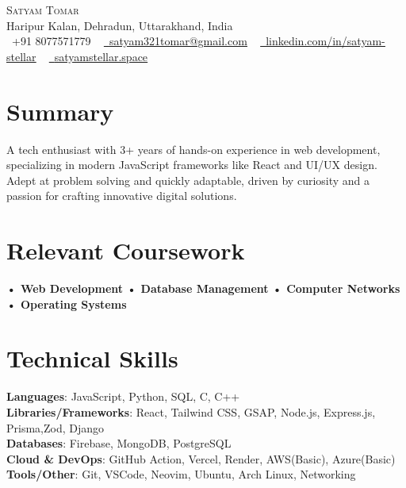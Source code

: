 \documentclass[letterpaper,11pt]{article}
\begin{document}
\begin{center}
    {\Huge \scshape Satyam Tomar} \\ \vspace{1pt}
    Haripur Kalan, Dehradun, Uttarakhand, India \\ \vspace{1pt}
    \small \raisebox{-0.1\height}\faPhone\ +91 8077571779 ~ \href{mailto:satyam321tomar@gmail.com}{\raisebox{-0.2\height}\faEnvelope\  \underline{satyam321tomar@gmail.com}} ~ 
    \href{https://www.linkedin.com/in/satyam-stellar/}{\raisebox{-0.2\height}\faLinkedin\ \underline{linkedin.com/in/satyam-stellar}}  ~
    \href{https://satyamstellar.space/}{\raisebox{-0.2\height}\faLink\ \underline{satyamstellar.space}}
    \vspace{-5pt}
\end{center}

\section{Summary}
A tech enthusiast with 3+ years of hands-on experience in web development, specializing in modern JavaScript frameworks like React and UI/UX design. Adept at problem solving and quickly adaptable, driven by curiosity and a passion for crafting innovative digital solutions.

\section{Relevant Coursework}
\noindent
\textbf{• Web Development} \hfill \textbf{• Database Management} \hfill \textbf{• Computer Networks} \hfill \textbf{• Operating Systems}

\section{Technical Skills}
\begin{itemize}[leftmargin=0.15in, label={}]
\small{\item{
\textbf{Languages}{: JavaScript, Python, SQL, C, C++} \\
\textbf{Libraries/Frameworks}{: React, Tailwind CSS, GSAP, Node.js, Express.js, Prisma,Zod, Django} \\
\textbf{Databases}{: Firebase, MongoDB, PostgreSQL} \\
\textbf{Cloud \& DevOps}{: GitHub Action,  Vercel, Render, AWS(Basic), Azure(Basic) }\\
\textbf{Tools/Other}{: Git, VSCode, Neovim, Ubuntu, Arch Linux, Networking }
}}
\end{itemize}
\end{document}
